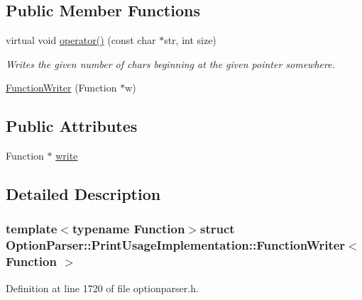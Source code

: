 \subsection*{Public Member Functions}
\begin{DoxyCompactItemize}
\item 
virtual void \hyperlink{struct_option_parser_1_1_print_usage_implementation_1_1_function_writer_a89e05b7e10c23185619b362e20f06cf8}{operator()} (const char $\ast$str, int size)
\begin{DoxyCompactList}\small\item\em Writes the given number of chars beginning at the given pointer somewhere. \end{DoxyCompactList}\item 
\hyperlink{struct_option_parser_1_1_print_usage_implementation_1_1_function_writer_a60681e5528899d5043b7af59c402edcc}{Function\-Writer} (Function $\ast$w)
\end{DoxyCompactItemize}
\subsection*{Public Attributes}
\begin{DoxyCompactItemize}
\item 
Function $\ast$ \hyperlink{struct_option_parser_1_1_print_usage_implementation_1_1_function_writer_a818f643ba521b0ca66dc13a9a32e5750}{write}
\end{DoxyCompactItemize}


\subsection{Detailed Description}
\subsubsection*{template$<$typename Function$>$struct Option\-Parser\-::\-Print\-Usage\-Implementation\-::\-Function\-Writer$<$ Function $>$}



Definition at line 1720 of file optionparser.\-h.



